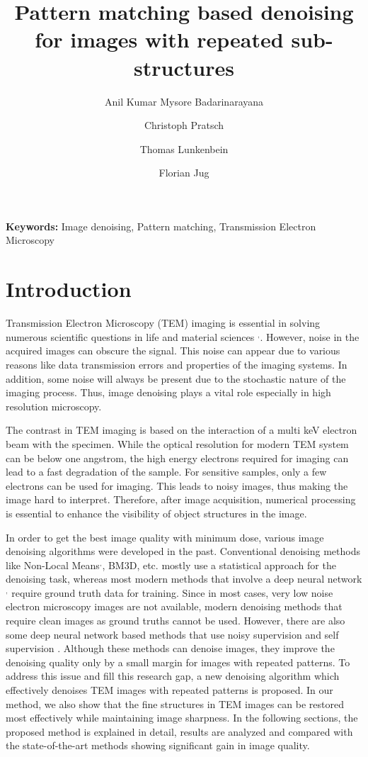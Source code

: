 \documentclass[fleqn,10pt]{wlscirep}
\title{Pattern matching based denoising for images with repeated sub-structures}
\author[1,*]{Anil Kumar Mysore Badarinarayana}
\author[1]{Christoph Pratsch}
\author[2]{Thomas Lunkenbein}
\author[3]{Florian Jug}
\affil[1]{Hemholtz-Zentrum Berlin, X-ray microscopy, Berlin, 12489, Germany}
\affil[2]{Fritz Haber Institute, Department of Inorganic Chemistry, Berlin, 14195, Germany}
\affil[3]{Fondazione Human Technopole, Computational Biology, Milan, 20157, Italy}
\affil[*]{anil.mysore\_badarinarayana@helmholtz-berlin.de}
\begin{document}
	
	\maketitle
	
	\noindent
	\textbf{Keywords:} Image denoising, Pattern matching, Transmission Electron Microscopy
	
	\section*{Introduction}
	
	Transmission Electron Microscopy (TEM) imaging is essential in solving numerous scientific questions in life and material sciences \cite{CURRY200691}$^{,}$\cite{WANG2008395}. However, noise in the acquired images can obscure the signal. This noise can appear due to various reasons like data transmission errors and properties of the imaging systems. In addition, some noise will always be present due to the stochastic nature of the imaging process. Thus, image denoising plays a vital role especially in high resolution microscopy.
	
	The contrast in TEM imaging is based on the interaction of a multi keV electron beam with the specimen. While the optical resolution for modern TEM system can be below one angstrom,  the high energy electrons required for imaging can lead to a fast degradation of the sample. For sensitive samples, only a few electrons can be used for imaging. This leads to noisy images, thus making the image hard to interpret. Therefore, after image acquisition, numerical processing is essential to enhance the visibility of object structures in the image.
	
	In order to get the best image quality with minimum dose, various image denoising algorithms were developed in the past. Conventional denoising methods like Non-Local Means\cite{bcm_nlm}$^{,}$, BM3D\cite{DBLP:journals/tip/BM3D}, etc. mostly use a statistical approach for the denoising task, whereas most modern methods that involve a deep neural network\cite{zhang2018ffdnet}$^{,}$ \cite{zhang2017beyond} require ground truth data for training. Since in most cases, very low noise electron microscopy images are not available, modern denoising methods that require clean images as ground truths cannot be used. However, there are also some deep neural network based methods that use noisy supervision\cite{DBLP:journals/corr/abs-1803-04189} and self supervision\cite{krull2019noise2void} . Although these methods can denoise images, they improve the denoising quality only by a small margin for images with repeated patterns. To address this issue and fill this research gap, a new denoising algorithm which effectively denoises TEM images with repeated patterns is proposed. In  our method, we also show that the fine structures in TEM images can be restored most effectively while maintaining image sharpness. In the following sections, the proposed method is explained in detail, results are analyzed and compared with the state-of-the-art methods showing significant gain in image quality. 
	
\end{document}
